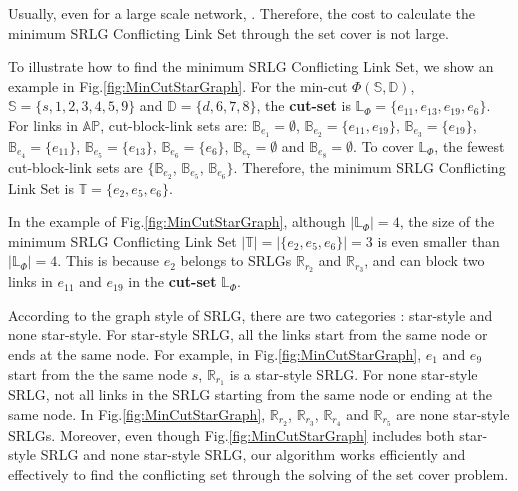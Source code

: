 
Usually, even for a large scale network, . Therefore, the cost to calculate the minimum SRLG Conflicting Link Set through the set cover is not large.

To illustrate how to find the minimum SRLG Conflicting Link Set, we show an example in Fig.\ref{fig:MinCutStarGraph}. For the min-cut $\Phi(\mathbb{S},\mathbb{D})$, $\mathbb{S}=\{s, 1, 2, 3, 4, 5, 9\}$ and $\mathbb{D}=\{d, 6, 7, 8\}$, the \textbf{cut-set} is $\mathbb{L}_{\Phi}=\{e_{11},e_{13},e_{19},e_{6}\}$. For links in $\mathbb{AP}$,  cut-block-link sets are: $\mathbb{B}_{e_1}=\emptyset$, $\mathbb{B}_{e_2}=\{e_{11},e_{19}\}$, $\mathbb{B}_{e_3}=\{e_{19}\}$, $\mathbb{B}_{e_4}=\{e_{11}\}$, $\mathbb{B}_{e_5}=\{e_{13}\}$, $\mathbb{B}_{e_6}=\{e_6\}$, $\mathbb{B}_{e_7}=\emptyset$ and $\mathbb{B}_{e_8}=\emptyset$. To cover $\mathbb{L}_{\Phi}$, the fewest cut-block-link sets are $\{\mathbb{B}_{e_2}$, $\mathbb{B}_{e_5}$, $\mathbb{B}_{e_6}\}$. Therefore, the minimum SRLG Conflicting Link Set is $\mathbb{T}=\{e_2, e_5, e_6 \}$.

In the example of Fig.\ref{fig:MinCutStarGraph}, although $|\mathbb{L}_{\Phi}|=4$, the size of  the minimum SRLG Conflicting Link Set $|\mathbb{T}|=|\{e_2, e_5, e_6 \}|=3$ is even smaller than $|\mathbb{L}_{\Phi}|=4$. This is because $e_2$ belongs to   SRLGs $\mathbb{R}_{r_2}$ and $\mathbb{R}_{r_3}$, and can block two links in $e_{11}$ and  $e_{19}$ in the \textbf{cut-set} $\mathbb{L}_{\Phi}$.

According to the graph style of SRLG, there are two categories \cite{datta2008graph}:  star-style and none star-style. For star-style SRLG, all the links start from the same node or ends at the same node. For example, in Fig.\ref{fig:MinCutStarGraph}, $e_1$ and $e_9$ start from the  the same node $s$, $\mathbb{R}_{r_1}$ is a star-style SRLG.  For none star-style SRLG, not all links in the SRLG starting from the same node or ending at the same node. In Fig.\ref{fig:MinCutStarGraph}, $\mathbb{R}_{r_2}$, $\mathbb{R}_{r_3}$, $\mathbb{R}_{r_4}$ and $\mathbb{R}_{r_5}$ are none star-style SRLGs.
Moreover, even though Fig.\ref{fig:MinCutStarGraph} includes both  star-style SRLG  and none star-style SRLG,  our  algorithm works efficiently and effectively to find the conflicting set through the solving of the set cover problem.

